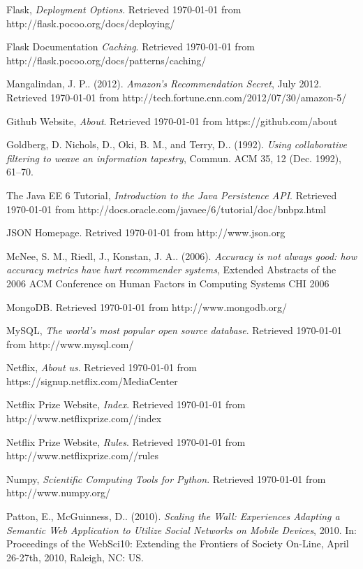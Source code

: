 \begin{thebibliography}{9}
     Flask, \emph{Deployment Options}. Retrieved \today{} from http://flask.pocoo.org/docs/deploying/

     Flask Documentation \emph{Caching}. Retrieved \today{} from http://flask.pocoo.org/docs/patterns/caching/

     Mangalindan, J. P.. (2012). \emph{Amazon's Recommendation Secret}, July 2012. Retrieved \today{} from http://tech.fortune.cnn.com/2012/07/30/amazon-5/

     Github Website, \emph{About}. Retrieved \today{} from https://github.com/about

     Goldberg, D. Nichols, D., Oki, B. M., and Terry, D.. (1992). \emph{Using collaborative filtering to weave an information tapestry}, Commun. ACM 35, 12 (Dec. 1992), 61--70.

     The Java EE 6 Tutorial, \emph{Introduction to the Java Persistence API}. Retrieved \today{} from http://docs.oracle.com/javaee/6/tutorial/doc/bnbpz.html

     JSON Homepage. Retrived \today{} from http://www.json.org

     McNee, S. M., Riedl, J., Konstan, J. A.. (2006). \emph{Accuracy is not always good: how accuracy metrics have hurt recommender systems}, Extended Abstracts of the 2006 ACM Conference on Human Factors in Computing Systems CHI 2006

     MongoDB. Retrieved \today{} from http://www.mongodb.org/

     MySQL, \emph{The world's most popular open source database}. Retrieved \today{} from http://www.mysql.com/

     Netflix, \emph{About us}. Retrieved \today{} from https://signup.netflix.com/MediaCenter

     Netflix Prize Website, \emph{Index}.  Retrieved \today{} from http://www.netflixprize.com//index

     Netflix Prize Website, \emph{Rules}.  Retrieved \today{} from http://www.netflixprize.com//rules

     Numpy, \emph{Scientific Computing Tools for Python}. Retrieved \today{} from http://www.numpy.org/

     Patton, E., McGuinness, D.. (2010). \emph{Scaling the Wall: Experiences Adapting a Semantic Web Application to Utilize Social Networks on Mobile Devices}, 2010. In: Proceedings of the WebSci10: Extending the Frontiers of Society On-Line, April 26-27th, 2010, Raleigh, NC: US.


\end{thebibliography}
